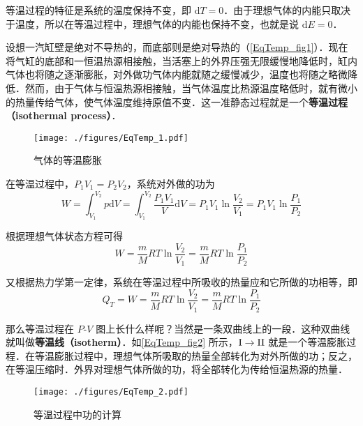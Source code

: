 

等温过程的特征是系统的温度保持不变，即 $\mathrm dT=0$．由于理想气体的内能只取决于温度，所以在等温过程中，理想气体的内能也保持不变，也就是说 $\mathrm dE=0$．

设想一汽缸壁是绝对不导热的，而底部则是绝对导热的（\autoref{EqTemp_fig1}）．现在将气缸的底部和一恒温热源相接触，当活塞上的外界压强无限缓慢地降低时，缸内气体也将随之逐渐膨胀，对外做功气体内能就随之缓慢减少，温度也将随之略微降低．然而，由于气体与恒温热源相接触，当气体温度比热源温度略低时，就有微小的热量传给气体，使气体温度维持原值不变．这一准静态过程就是一个\textbf{等温过程（isothermal process）}．
\begin{figure}[ht]
\centering
\texttt{[image: ./figures/EqTemp\_1.pdf]}
\caption{气体的等温膨胀} \label{EqTemp_fig1}
\end{figure}

在等温过程中，$P_1V_1=P_2V_2$，系统对外做的功为
\begin{equation}
W= \int_{V_{1}}^{V_{2}} p \mathrm{d} V=\int_{V_{1}}^{V_{2}} \frac{P_{1} V_{1}}{V} \mathrm{d} V=P_{1} V_{1} \ln \frac{V_{2}}{V_{1}}=P_{1} V_{1} \ln \frac{P_{1}}{P_{2}}
\end{equation}

根据理想气体状态方程可得
\begin{equation}
W=\frac{m}{M} R T \ln \frac{V_{2}}{V_{1}}=\frac{m}{M} R T \ln \frac{P_{1}}{P_{2}}
\end{equation}

又根据热力学第一定律，系统在等温过程中所吸收的热量应和它所做的功相等，即
\begin{equation}\label{EqTemp_eq1}
Q_{T}=W=\frac{m}{M} R T \ln \frac{V_{2}}{V_{1}}=\frac{m}{M} R T \ln \frac{P_{1}}{P_{2}}
\end{equation}

那么等温过程在 $P$-$V$ 图上长什么样呢？当然是一条双曲线上的一段．这种双曲线就叫做\textbf{等温线（isotherm）}．如\autoref{EqTemp_fig2} 所示，$\rm I\to II$ 就是一个等温膨胀过程．在等温膨胀过程中，理想气体所吸取的热量全部转化为对外所做的功；反之，在等温压缩时．外界对理想气体所做的功，将全部转化为传给恒温热源的热量．

\begin{figure}[ht]
\centering
\texttt{[image: ./figures/EqTemp\_2.pdf]}
\caption{等温过程中功的计算} \label{EqTemp_fig2}
\end{figure}
